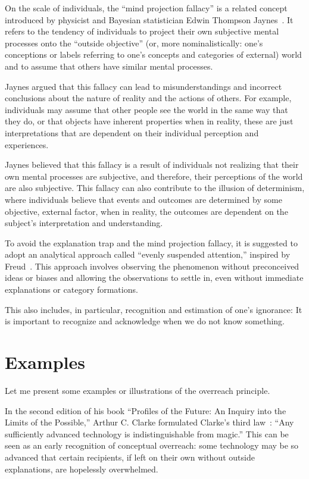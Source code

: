 On the scale of individuals, the ``mind projection fallacy'' is a related concept introduced by physicist and
Bayesian statistician Edwin Thompson Jaynes~\cite{jaynes-89}.
It refers to the tendency of individuals to project their own subjective mental processes onto the ``outside objective''
(or, more nominalistically:
one's conceptions or labels referring to one's concepts and categories of external)
world and to assume that others have similar mental processes.

Jaynes argued that this fallacy can lead to misunderstandings and incorrect conclusions about the nature of reality and the actions of others. For example, individuals may assume that other people see the world in the same way that they do, or that objects have inherent properties when in reality, these are just interpretations that are dependent on their individual perception and experiences.

Jaynes believed that this fallacy is a result of individuals not realizing that their own mental processes are subjective, and therefore, their perceptions of the world are also subjective. This fallacy can also contribute to the illusion of determinism, where individuals believe that events and outcomes are determined by some objective, external factor, when in reality, the outcomes are dependent on the subject's interpretation and understanding.

To avoid the explanation trap and the mind projection fallacy, it is suggested to adopt an analytical approach called ``evenly suspended attention,'' inspired by Freud~\cite{Freud-itp,Freud-itpe}. This approach involves observing the phenomenon without preconceived ideas or biases and allowing the observations to settle in, even without immediate explanations or category formations.

This also includes, in particular, recognition and estimation of one's ignorance:
It is important to recognize and acknowledge when we do not know something.

\section{Examples}


Let me present some examples or illustrations of the overreach principle.



In the second edition of his book ``Profiles of the Future: An Inquiry into the Limits of the Possible,'' Arthur C. Clarke formulated Clarke's third law~\cite{Clarke2000Jan}:
``Any sufficiently advanced technology is indistinguishable from magic.''
This can be seen as an early recognition of conceptual overreach: some technology may be so advanced
that certain recipients, if left on their own without outside explanations, are hopelessly overwhelmed.

